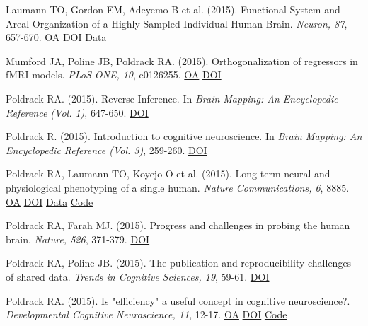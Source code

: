 \documentclass[10pt, letterpaper]{article}
\begin{document}
Laumann TO, Gordon EM, Adeyemo B et al. (2015). Functional System and Areal Organization of a Highly Sampled Individual Human Brain. \textit{Neuron, 87}, 657-670. \href{https://www.ncbi.nlm.nih.gov/pmc/articles/PMC4642864}{OA} \href{https://doi.org/10.1016/j.neuron.2015.06.037}{DOI} \href{https://openneuro.org/datasets/ds000031/versions/00001}{Data} \vspace{2mm}

Mumford JA, Poline JB, Poldrack RA.  (2015). Orthogonalization of regressors in fMRI models. \textit{PLoS ONE, 10}, e0126255. \href{https://www.ncbi.nlm.nih.gov/pmc/articles/PMC4412813}{OA} \href{https://doi.org/10.1371/journal.pone.0126255}{DOI} \vspace{2mm}

Poldrack RA.  (2015). Reverse Inference. In \textit{Brain Mapping: An Encyclopedic Reference (Vol. 1)}, 647-650. \href{https://doi.org/10.1016/b978-0-12-397025-1.00346-8}{DOI} \vspace{2mm}

Poldrack R.  (2015). Introduction to cognitive neuroscience. In \textit{Brain Mapping: An Encyclopedic Reference (Vol. 3)}, 259-260. \href{https://doi.org/10.1016/b978-0-12-397025-1.09990-5}{DOI} \vspace{2mm}

Poldrack RA, Laumann TO, Koyejo O et al. (2015). Long-term neural and physiological phenotyping of a single human. \textit{Nature Communications, 6}, 8885. \href{https://www.ncbi.nlm.nih.gov/pmc/articles/PMC4682164}{OA} \href{https://doi.org/10.1038/ncomms9885}{DOI} \href{https://openneuro.org/datasets/ds000031/versions/00001}{Data} \href{https://github.com/poldrack/myconnectome}{Code} \vspace{2mm}

Poldrack RA, Farah MJ.  (2015). Progress and challenges in probing the human brain. \textit{Nature, 526}, 371-379. \href{https://doi.org/10.1038/nature15692}{DOI} \vspace{2mm}

Poldrack RA, Poline JB.  (2015). The publication and reproducibility challenges of shared data. \textit{Trends in Cognitive Sciences, 19}, 59-61. \href{https://doi.org/10.1016/j.tics.2014.11.008}{DOI} \vspace{2mm}

Poldrack RA.  (2015). Is "efficiency" a useful concept in cognitive neuroscience?. \textit{Developmental Cognitive Neuroscience, 11}, 12-17. \href{https://www.ncbi.nlm.nih.gov/pmc/articles/PMC6989750}{OA} \href{https://doi.org/10.1016/j.dcn.2014.06.001}{DOI} \href{https://github.com/poldrack/rtmodel}{Code} \vspace{2mm}
\end{document}
